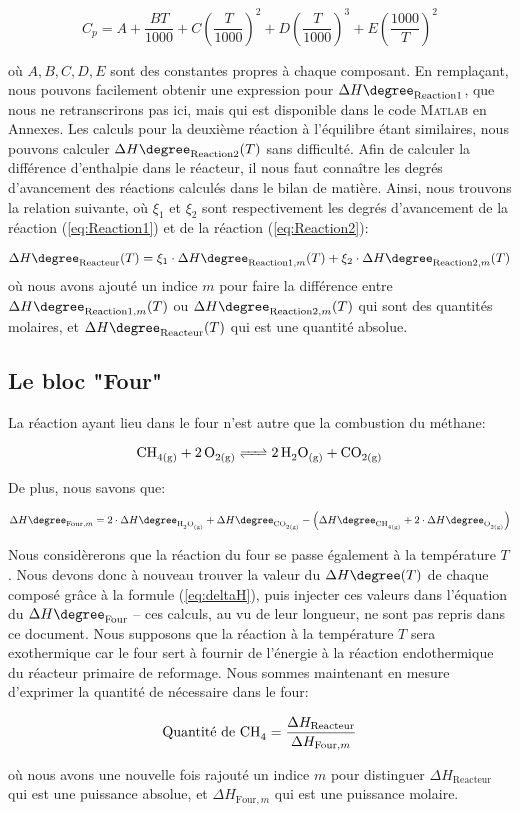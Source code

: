 \begin{equation}\label{eqref:capacite}
C_p=A+\dfrac{BT}{1000}+C\left(\dfrac{T}{1000}\right)^2+D\left(\dfrac{T}{1000}\right)^3+E\left(\dfrac{1000}{T}\right)^2
\end{equation}

où $A,B,C,D,E$ sont des constantes propres à chaque composant.
En remplaçant, nous pouvons facilement obtenir une expression pour $\Delta H\degree_{\text{Reaction1}}$, que nous ne retranscrirons pas
ici, mais qui est disponible dans le code \textsc{Matlab} en Annexes. 
Les calculs pour la deuxième réaction à l'équilibre étant similaires, nous pouvons
calculer $\Delta H\degree_{\text{Reaction2}}(T)$ sans difficulté. Afin de calculer la différence d'enthalpie dans le réacteur,
il nous faut connaître les degrés d'avancement des réactions calculés dans le bilan de matière. Ainsi, nous
trouvons la relation suivante, où $\xi_1$ et $\xi_2$ sont respectivement les degrés d'avancement de la
réaction (\ref{eq:Reaction1}) et de la réaction (\ref{eq:Reaction2}):

\begin{equation}\label{eq:deltaHreacteur}{\Delta H\degree_{\text{Reacteur}}(T)=\xi_1\cdot\Delta H\degree_{\text{Reaction1},m}(T)+\xi_2\cdot\Delta H\degree_{\text{Reaction2},m}(T)}\end{equation}
où nous avons ajouté un indice $m$ pour faire la différence entre $\Delta H\degree_{\text{Reaction1},m}(T)$ ou $\Delta H\degree_{\text{Reaction2},m}(T)$ qui sont des quantités molaires, et $\Delta H\degree_{\text{Reacteur}}(T)$ qui est une quantité absolue.

\newpage

\subsection{Le bloc "Four"}
La réaction ayant lieu dans le four n'est autre que la combustion du méthane:

\begin{equation}\label{combust.methane}\ce{CH_{4(g)} + 2O_{2(g)} <=> 2H_2O_{(g)} + CO_{2(g)}}\end{equation}

De plus, nous savons que:

$$\Delta H\degree_{\text{Four},m} = 2\cdot \Delta H\degree_{\ce{H_{2}O_{(g)}}} + \Delta H\degree_{\ce{CO_{2(g)}}}
- \left(\Delta H\degree_{\ce{CH_{4(g)}}} + 2\cdot \Delta H\degree_{\ce{O_{2(g)}}}\right)$$

Nous considèrerons que la réaction du four se passe également à la température $T$. 
Nous devons donc à nouveau trouver la valeur du $\Delta H\degree(T)$ de chaque composé grâce à la formule (\ref{eq:deltaH}),
puis injecter ces valeurs dans l'équation du $\Delta H\degree_{\text{Four}}$ -- ces calculs, au vu de leur longueur, ne sont pas repris dans
ce document. Nous supposons que la réaction à la température $T$ sera exothermique car le four sert à fournir de l'énergie à la réaction
endothermique du réacteur primaire de reformage. 
Nous sommes maintenant en mesure d'exprimer la quantité de  nécessaire dans le four:

$$\text{Quantité de \ce{CH_4}} = \dfrac{\Delta H_{\text{Reacteur}}}{\Delta H_{\text{Four},m}}$$

où nous avons une nouvelle fois rajouté un indice $m$ pour distinguer $\Delta H_{\text{Reacteur}}$ qui est une puissance
absolue, et $\Delta H_{\text{Four},m}$ qui est une puissance molaire.



